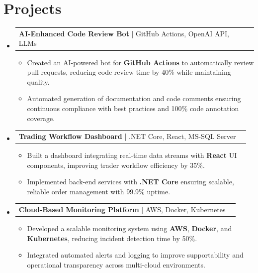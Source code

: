 \documentclass[letterpaper,11pt]{article}
\makeatletter
\newcommand{\resumeItem}[1]{
  \item\footnotesize{
    {#1 \vspace{-2pt}}
  }
}
\newcommand{\resumeProjectHeading}[2]{
    \item
    \begin{tabular*}{1.001\textwidth}{l@{\extracolsep{\fill}}r}
      \small#1 & \textbf{\small #2}\\
    \end{tabular*}\vspace{-7pt}
}
\newcommand{\resumeSubHeadingListStart}{\begin{itemize}[leftmargin=0pt, label={}]}
\newcommand{\resumeSubHeadingListEnd}{\end{itemize}}
\newcommand{\resumeItemListStart}{\begin{itemize}[leftmargin=*]}
\newcommand{\resumeItemListEnd}{\end{itemize}\vspace{-5pt}}
\makeatother
\begin{document}
\section{Projects}
    \vspace{-5pt}
    \resumeSubHeadingListStart
      \resumeProjectHeading
          {\textbf{AI-Enhanced Code Review Bot} | GitHub Actions, OpenAI API, LLMs}{}
          \resumeItemListStart
              \resumeItem{Created an AI-powered bot for \textbf{GitHub Actions} to automatically review pull requests, reducing code review time by 40\% while maintaining quality.}
              \resumeItem{Automated generation of documentation and code comments ensuring continuous compliance with best practices and 100\% code annotation coverage.}
          \resumeItemListEnd
          \vspace{-12pt}
      \resumeProjectHeading
          {\textbf{Trading Workflow Dashboard} | .NET Core, React, MS-SQL Server}{}
          \resumeItemListStart
              \resumeItem{Built a dashboard integrating real-time data streams with \textbf{React} UI components, improving trader workflow efficiency by 35\%.}
              \resumeItem{Implemented back-end services with \textbf{.NET Core} ensuring scalable, reliable order management with 99.9\% uptime.}
          \resumeItemListEnd
          \vspace{-12pt}
      \resumeProjectHeading
          {\textbf{Cloud-Based Monitoring Platform} | AWS, Docker, Kubernetes}{}
          \resumeItemListStart
              \resumeItem{Developed a scalable monitoring system using \textbf{AWS}, \textbf{Docker}, and \textbf{Kubernetes}, reducing incident detection time by 50\%.}
              \resumeItem{Integrated automated alerts and logging to improve supportability and operational transparency across multi-cloud environments.}
          \resumeItemListEnd 
    \resumeSubHeadingListEnd
\end{document}
